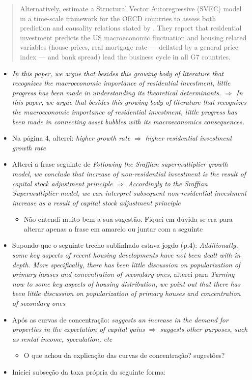 \documentclass[11pt]{article}
\begin{document}
\begin{quote}
Alternatively, \textcite{huang_is_2020} estimate a Structural Vector Autoregressive (SVEC) model in a time-scale framework for the OECD countries to assess both prediction and causality relations stated by \textcite{leamer_housing_2007}.
They report that residential investment predicts the US  macroeconomic fluctuation and housing related variables (house prices, real mortgage rate --- deflated by a general price index --- and bank spread) lead the business cycle in all G7 countries.
\end{quote}

\begin{itemize}
\item \emph{In this paper, we argue that besides this growing body of literature that recognizes the macroeconomic importance of residential investment, little progress has been made in understanding its theoretical determinants.} \(\Rightarrow\) \emph{In this paper, we argue that besides this growing body of literature that recognizes the macroeconomic importance of residential investment, little progress has been made in connecting asset bubbles with its macroeconomics consequences.}
\item Na página 4, alterei: \emph{higher growth rate} \(\Rightarrow\) \emph{higher residential investment growth rate}
\item Alterei a frase seguinte de \emph{Following the Sraffian supermultiplier growth model, we conclude that increase of non-residential investment is the result of capital stock adjustment principle} \(\Rightarrow\) \emph{Accordingly to the Sraffian Supermultiplier model, we can interpret subsequent non-residential investment increase as a result of capital stock adjustment principle}
\begin{itemize}
\item Não entendi muito bem a sua sugestão. Fiquei em dúvida se era para alterar apenas a frase em amarelo ou juntar com a seguinte
\end{itemize}
\item Supondo que o seguinte trecho sublinhado estava jogdo (p.4): \emph{Additionally, some key aspects of recent housing developments have not been dealt with in depth. More specifically, there has been little discussion on popularization of primary houses and concentration of secondary ones}, alterei para \emph{Turning now to some key aspects of housing distribution, we point out that  there has been little discussion on popularization of primary houses and concentration of secondary ones}
\item Após as curvas de concentração: \emph{suggests an increase in the demand for properties in the expectation of capital gains} \(\Rightarrow\) \emph{suggests other purposes, such as rental income, speculation, etc}
\begin{itemize}
\item O que achou da explicação das curvas de concentração? sugestões?
\end{itemize}
\item Iniciei subseção da taxa própria da seguinte forma:
\end{itemize}
\end{document}
